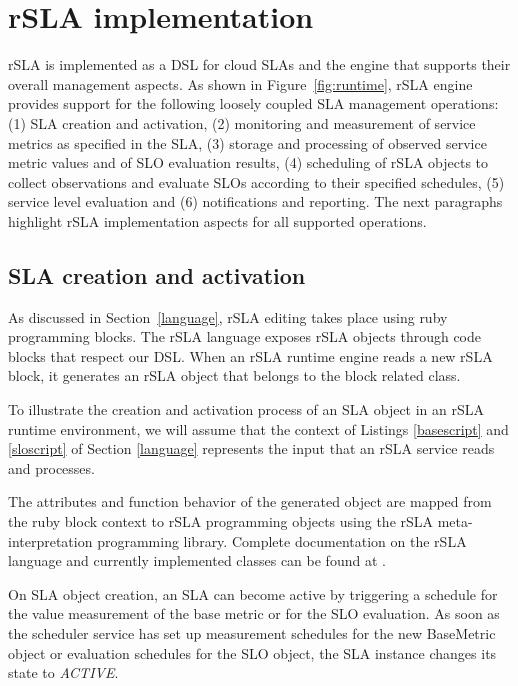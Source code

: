 \section{rSLA implementation}\label{sec:runtime} 

rSLA is implemented as a DSL for cloud SLAs and the engine that supports their overall management aspects. As shown in Figure~\ref{fig:runtime}, rSLA engine provides support for the following loosely coupled SLA management operations: (1) SLA creation and activation, (2) monitoring and measurement of service metrics as specified in the SLA, (3) storage and processing of observed service metric values and of SLO evaluation results, (4) scheduling of rSLA objects to collect observations and evaluate SLOs according to their specified schedules, (5) service level evaluation and (6) notifications and reporting.
The next paragraphs highlight rSLA implementation aspects for all supported operations.

\subsection{SLA creation and activation}

As discussed in Section~\ref{language}, rSLA editing takes place using ruby programming blocks. The rSLA language exposes rSLA objects through code blocks that respect our DSL. When an rSLA runtime engine reads a new rSLA block, it generates an rSLA object that belongs to the block related class. 

To illustrate the creation and activation process of an SLA object in an rSLA runtime environment, we will assume that the context of Listings \ref{basescript} and \ref{sloscript} of Section \ref{language} represents the input that an rSLA service reads and processes. 

The attributes and function behavior of the generated object are mapped from the ruby block context to rSLA programming objects using the rSLA meta-interpretation programming library. Complete documentation on the rSLA language and currently implemented classes can be found at \cite{rSLAspec}.

On SLA object creation, an SLA can become active by triggering a schedule for the value measurement of the base metric or for the SLO evaluation. As soon as the scheduler service has set up measurement schedules for the new BaseMetric object or evaluation schedules for the SLO object, the SLA instance changes its state to \emph{ACTIVE}. 

